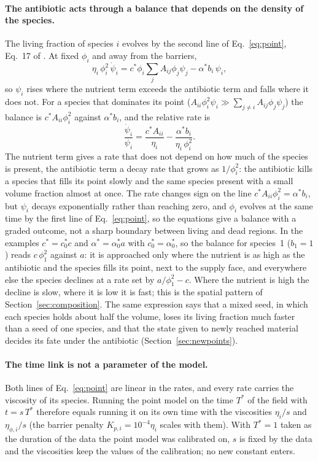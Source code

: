 \documentclass[11pt,a4paper]{article}
\begin{document}
\paragraph{The antibiotic acts through a balance that depends on the density of the species.} The living fraction of species $i$ evolves by the second line of Eq.~\eqref{eq:point}, Eq.~17 of \citet{Klempt2026ContinuumBacterialGrowth}. At fixed $\phi_i$ and away from the barriers,
\begin{equation}
\eta_i\,\phi_i^2\,\dot\psi_i=c^*\phi_i\textstyle\sum_jA_{ij}\phi_j\psi_j-\alpha^*b_i\,\psi_i,
\label{eq:psi}
\end{equation}
so $\psi_i$ rises where the nutrient term exceeds the antibiotic term and falls where it does not. For a species that dominates its point ($A_{ii}\phi_i^2\psi_i\gg\sum_{j\neq i}A_{ij}\phi_j\psi_j$) the balance is $c^*A_{ii}\phi_i^2$ against $\alpha^*b_i$, and the relative rate is
\begin{equation}
\frac{\dot\psi_i}{\psi_i}=\frac{c^*A_{ii}}{\eta_i}-\frac{\alpha^*b_i}{\eta_i\,\phi_i^2}.
\label{eq:rate}
\end{equation}
The nutrient term gives a rate that does not depend on how much of the species is present, the antibiotic term a decay rate that grows as $1/\phi_i^2$: the antibiotic kills a species that fills its point slowly and the same species present with a small volume fraction almost at once. The rate changes sign on the line $c^*A_{ii}\phi_i^2=\alpha^*b_i$, but $\psi_i$ decays exponentially rather than reaching zero, and $\phi_i$ evolves at the same time by the first line of Eq.~\eqref{eq:point}, so the equations give a balance with a graded outcome, not a sharp boundary between living and dead regions. In the examples $c^*=c^*_0c$ and $\alpha^*=\alpha^*_0a$ with $c^*_0=\alpha^*_0$, so the balance for species~1 ($b_1=1$) reads $c\,\phi_1^2$ against $a$: it is approached only where the nutrient is as high as the antibiotic and the species fills its point, next to the supply face, and everywhere else the species declines at a rate set by $a/\phi_1^2-c$. Where the nutrient is high the decline is slow, where it is low it is fast; this is the spatial pattern of Section~\ref{sec:composition}. The same expression says that a mixed seed, in which each species holds about half the volume, loses its living fraction much faster than a seed of one species, and that the state given to newly reached material decides its fate under the antibiotic (Section~\ref{sec:newpoints}).

\paragraph{The time link is not a parameter of the model.} Both lines of Eq.~\eqref{eq:point} are linear in the rates, and every rate carries the viscosity of its species. Running the point model on the time $T^*$ of the field with $t=s\,T^*$ therefore equals running it on its own time with the viscosities $\eta_i/s$ and $\eta_{\phi,i}/s$ (the barrier penalty $K_{p,i}=10^{-4}\eta_i$ scales with them). With $T^*=1$ taken as the duration of the data the point model was calibrated on, $s$ is fixed by the data and the viscosities keep the values of the calibration; no new constant enters.
\end{document}
